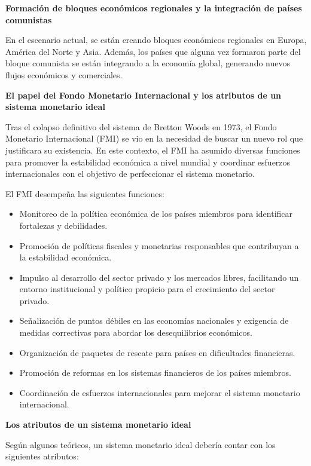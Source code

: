 \documentclass[
  letterpaper,
  DIV=11,
  numbers=noendperiod]{scrartcl}
\begin{document}
\textbf{Formación de bloques económicos regionales y la integración de
países comunistas}

En el escenario actual, se están creando bloques económicos regionales
en Europa, América del Norte y Asia. Además, los países que alguna vez
formaron parte del bloque comunista se están integrando a la economía
global, generando nuevos flujos económicos y comerciales.

\textbf{El papel del Fondo Monetario Internacional y los atributos de un
sistema monetario ideal}

Tras el colapso definitivo del sistema de Bretton Woods en 1973, el
Fondo Monetario Internacional (FMI) se vio en la necesidad de buscar un
nuevo rol que justificara su existencia. En este contexto, el FMI ha
asumido diversas funciones para promover la estabilidad económica a
nivel mundial y coordinar esfuerzos internacionales con el objetivo de
perfeccionar el sistema monetario.

El FMI desempeña las siguientes funciones:

\begin{itemize}
\item
  Monitoreo de la política económica de los países miembros para
  identificar fortalezas y debilidades.
\item
  Promoción de políticas fiscales y monetarias responsables que
  contribuyan a la estabilidad económica.
\item
  Impulso al desarrollo del sector privado y los mercados libres,
  facilitando un entorno institucional y político propicio para el
  crecimiento del sector privado.
\item
  Señalización de puntos débiles en las economías nacionales y exigencia
  de medidas correctivas para abordar los desequilibrios económicos.
\item
  Organización de paquetes de rescate para países en dificultades
  financieras.
\item
  Promoción de reformas en los sistemas financieros de los países
  miembros.
\item
  Coordinación de esfuerzos internacionales para mejorar el sistema
  monetario internacional.
\end{itemize}

\textbf{Los atributos de un sistema monetario ideal}

Según algunos teóricos, un sistema monetario ideal debería contar con
los siguientes atributos:
\end{document}
